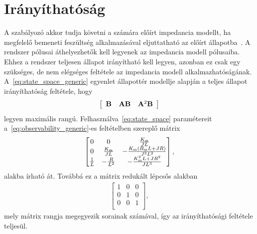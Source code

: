 \section{Irányíthatóság}\label{chap:controllability}
A szabályozó akkor tudja követni a számára előírt impedancia modellt, 
ha megfelelő bemeneti feszültség alkalmazásával eljuttatható az előírt állapotba~\cite{kalman1963controllability}.
A rendszer pólusai áthelyezhetők kell legyenek az impedancia modell pólusaiba. Ehhez 
a rendszer teljesen állapot irányítható kell legyen, azonban ez csak egy szükséges, 
de nem elégséges feltétele az impedancia modell alkalmazhatóságának.
A~\eqref{eq:state_space_generic} egyenlet állapottér modellje alapján a teljes állapot irányíthatóság feltétele, hogy
\begin{align}\label{eq:observability_generic}
    \left[\begin{array}{c|c|c}
        \mathbf{B} & \mathbf{AB} & \mathbf{A}^2 \mathbf{B}
    \end{array}\right]
\end{align}
legyen maximális rangú. 
Felhasználva~\eqref{eq:state_space} paramétereit a~\eqref{eq:observability_generic}-es feltételben szereplő mátrix
\begin{align}
    \begin{bmatrix}
        0 & 0 & \frac{K_{\mathrm{m}}}{JL} \\
        0 & \frac{K_{\mathrm{m}}}{JL} & -\frac{K_{\mathrm{m}}\left(B_{\mathrm{m}} L + JR\right)}{J^2 L^2} \\
        \frac{1}{L} & -\frac{R}{L^2} & -\frac{K^2_{\mathrm{m}} L + JR^2}{J L^3} \\
    \end{bmatrix},
\end{align}
alakba írható át. Továbbá ez a mátrix redukált lépcsős alakban
\begin{align}
    \begin{bmatrix}
        1 & 0 & 0 \\
        0 & 1 & 0 \\
        0 & 0 & 1 \\
    \end{bmatrix},
\end{align}
mely mátrix rangja megegyezik sorainak számával, így az irányíthatósági feltétele teljesül.

